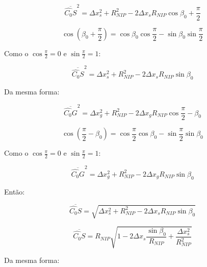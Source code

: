 \begin{equation}
 \label{eq:ap:1.10}
 \overline{\hat{C_0}S}^2 = \Delta x_{s}^2 + R_{NIP}^2 - 2 \Delta x_s R_{NIP} \cos{\beta_0 + \frac{\pi}{2}}
\end{equation}

\begin{equation}
 \label{eq:ap:1.11}
 \cos{\left( \beta_0 + \frac{\pi}{2} \right)} 
 = \cos{\beta_0} \cos{\frac{\pi}{2}} - \sin{\beta_0} \sin{\frac{\pi}{2}}
\end{equation}

Como o $\cos{\frac{\pi}{2}}=0$ e $\sin{\frac{\pi}{2}}=1$:

\begin{equation}
 \label{eq:ap:1.12}
 \overline{\hat{C_0}S}^2 = \Delta x_{s}^2 + R_{NIP}^2 - 2 \Delta x_s R_{NIP} \sin{\beta_0}
\end{equation}

Da mesma forma:

\begin{equation}
 \label{eq:ap:1.13}
 \overline{\hat{C_0}G}^2 = \Delta x_{g}^2 + R_{NIP}^2 - 2 \Delta x_g R_{NIP} \cos{\frac{\pi}{2} - \beta_0}
\end{equation}

\begin{equation}
 \label{eq:ap:1.14}
 \cos{\left( \frac{\pi}{2} - \beta_0 \right)} 
 = \cos{\frac{\pi}{2}} \cos{\beta_0} - \sin{\frac{\pi}{2}} \sin{\beta_0}
\end{equation}

Como o $\cos{\frac{\pi}{2}}=0$ e $\sin{\frac{\pi}{2}}=1$:

\begin{equation}
 \label{eq:ap:1.15}
 \overline{\hat{C_0}G}^2 = \Delta x_{g}^2 + R_{NIP}^2 - 2 \Delta x_g R_{NIP} \sin{\beta_0}
\end{equation}

Então:

\begin{equation}
 \label{eq:ap:1.16}
 \overline{\hat{C_0}S} = \sqrt{ \Delta x_{s}^2 + R_{NIP}^2 - 2 \Delta x_s R_{NIP} \sin{\beta_0} }
\end{equation}

\begin{equation}
 \label{eq:ap:1.17}
 \overline{\hat{C_0}S} = 
 R_{NIP} \sqrt{  1 - 2 \Delta x_s \frac{\sin{\beta_0}}{R_{NIP}} + \frac{\Delta x_{s}^2}{R_{NIP}^2} }
\end{equation}

Da mesma forma:

